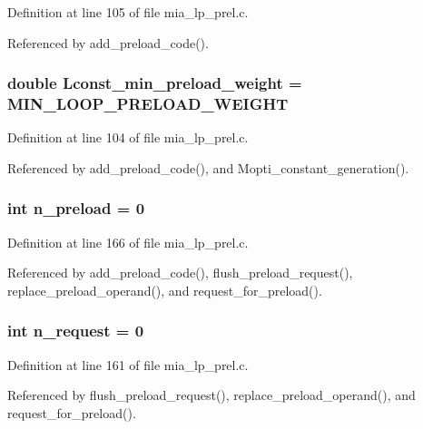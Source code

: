 Definition at line 105 of file mia\_\-lp\_\-prel.c.

Referenced by add\_\-preload\_\-code().
\subsubsection{\setlength{\rightskip}{0pt plus 5cm}double \bf{Lconst\_\-min\_\-preload\_\-weight} = MIN\_\-LOOP\_\-PRELOAD\_\-WEIGHT}\label{mia__lp__prel_8c_f0df201664b603e5b52607e588b40269}




Definition at line 104 of file mia\_\-lp\_\-prel.c.

Referenced by add\_\-preload\_\-code(), and Mopti\_\-constant\_\-generation().
\subsubsection{\setlength{\rightskip}{0pt plus 5cm}int \bf{n\_\-preload} = 0\hspace{0.3cm}{\tt  [static]}}\label{mia__lp__prel_8c_98c49189df14e601226192bb52d69b12}




Definition at line 166 of file mia\_\-lp\_\-prel.c.

Referenced by add\_\-preload\_\-code(), flush\_\-preload\_\-request(), replace\_\-preload\_\-operand(), and request\_\-for\_\-preload().
\subsubsection{\setlength{\rightskip}{0pt plus 5cm}int \bf{n\_\-request} = 0\hspace{0.3cm}{\tt  [static]}}\label{mia__lp__prel_8c_af67953e47646ec9b39eae7c699b370b}




Definition at line 161 of file mia\_\-lp\_\-prel.c.

Referenced by flush\_\-preload\_\-request(), replace\_\-preload\_\-operand(), and request\_\-for\_\-preload().
